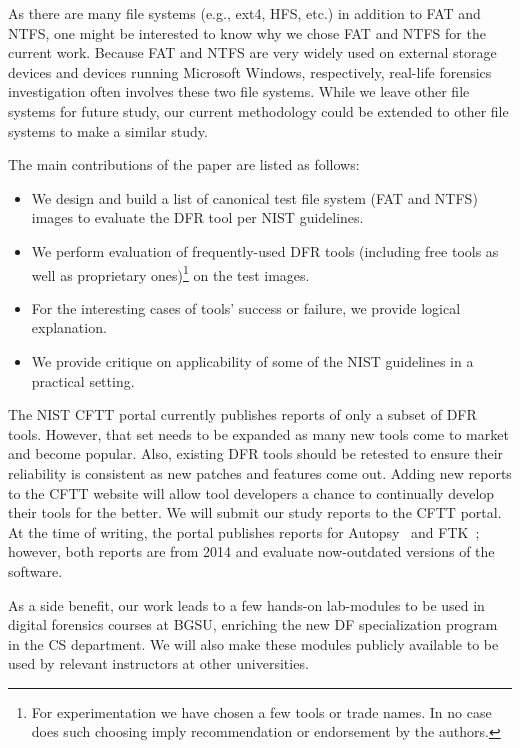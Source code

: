 As there are many file systems (e.g., ext4, HFS, etc.) in addition to FAT and NTFS, one might be interested to know why we chose FAT and NTFS for the current work. 
Because FAT and NTFS are very widely used on external storage devices and devices running Microsoft Windows, respectively,
real-life forensics investigation often involves these two file systems.
While we leave other file systems for future study, our current methodology could be 
extended to other file systems to make a similar study.

The main contributions of the paper are listed as follows:
\begin{itemize}
\item We design and build a list of canonical test file system (FAT and NTFS) images to evaluate the DFR tool per NIST guidelines. 
\item We perform evaluation of frequently-used DFR tools (including free tools as well as proprietary ones)\footnote{For experimentation 
we have chosen a few tools or trade names. In no case does such choosing imply recommendation or endorsement by the authors.} on the test images.
\item For the interesting cases of tools' success or failure, we provide logical explanation.
\item We provide critique on applicability of some of the NIST guidelines in a practical setting. 
\end{itemize}


The NIST CFTT portal currently publishes reports of only a subset of DFR tools. 
However, that set needs to be expanded as many new tools come to market and become popular.
Also, existing DFR tools should be retested to ensure their reliability is consistent 
as new patches and features come out. 
Adding new reports to the CFTT website will allow tool developers a 
chance to continually develop their tools for the better. We will submit our study reports to the CFTT portal.
At the time of writing, the portal publishes reports for Autopsy~\cite{dhs:autopsy} and FTK~\cite{dhs:ftk}; 
however, both reports are from 2014 and evaluate now-outdated versions of the software.

As a side benefit, our work leads to a few hands-on lab-modules to be used in digital forensics courses 
at BGSU, enriching the new DF specialization program in the CS department. We will also make these modules
publicly available to be used by relevant instructors at other universities.
